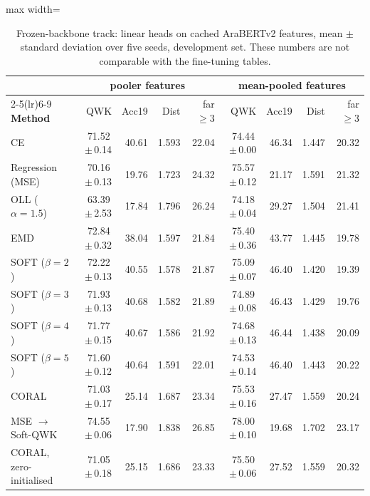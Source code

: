\begin{table}[H]
\centering
\footnotesize
\caption{Frozen-backbone track: linear heads on cached AraBERTv2 features, mean $\pm$ standard deviation over five seeds, development set. These numbers are not comparable with the fine-tuning tables.}
\label{tab:res-cpu}
\begin{adjustbox}{max width=\textwidth}
\begin{tabular}{lrrrrrrrr}
\toprule
& \multicolumn{4}{c}{\textbf{pooler features}} & \multicolumn{4}{c}{\textbf{mean-pooled features}} \\
\cmidrule(lr){2-5}\cmidrule(lr){6-9}
\textbf{Method} & QWK & Acc19 & Dist & far$\geq$3 & QWK & Acc19 & Dist & far$\geq$3 \\
\midrule
CE & 71.52\,$\pm$\,0.14 & 40.61 & 1.593 & 22.04 & 74.44\,$\pm$\,0.00 & 46.34 & 1.447 & 20.32 \\
Regression (MSE) & 70.16\,$\pm$\,0.13 & 19.76 & 1.723 & 24.32 & 75.57\,$\pm$\,0.12 & 21.17 & 1.591 & 21.32 \\
OLL ($\alpha=1.5$) & 63.39\,$\pm$\,2.53 & 17.84 & 1.796 & 26.24 & 74.18\,$\pm$\,0.04 & 29.27 & 1.504 & 21.41 \\
EMD & 72.84\,$\pm$\,0.32 & 38.04 & 1.597 & 21.84 & 75.40\,$\pm$\,0.36 & 43.77 & 1.445 & 19.78 \\
SOFT ($\beta=2$) & 72.22\,$\pm$\,0.13 & 40.55 & 1.578 & 21.87 & 75.09\,$\pm$\,0.07 & 46.40 & 1.420 & 19.39 \\
SOFT ($\beta=3$) & 71.93\,$\pm$\,0.13 & 40.68 & 1.582 & 21.89 & 74.89\,$\pm$\,0.08 & 46.43 & 1.429 & 19.76 \\
SOFT ($\beta=4$) & 71.77\,$\pm$\,0.15 & 40.67 & 1.586 & 21.92 & 74.68\,$\pm$\,0.13 & 46.44 & 1.438 & 20.09 \\
SOFT ($\beta=5$) & 71.60\,$\pm$\,0.12 & 40.64 & 1.591 & 22.01 & 74.53\,$\pm$\,0.14 & 46.40 & 1.443 & 20.22 \\
CORAL & 71.03\,$\pm$\,0.17 & 25.14 & 1.687 & 23.34 & 75.53\,$\pm$\,0.16 & 27.47 & 1.559 & 20.24 \\
\midrule
MSE $\rightarrow$ Soft-QWK & 74.55\,$\pm$\,0.06 & 17.90 & 1.838 & 26.85 & 78.00\,$\pm$\,0.10 & 19.68 & 1.702 & 23.17 \\
\midrule
CORAL, zero-initialised & 71.05\,$\pm$\,0.18 & 25.15 & 1.686 & 23.33 & 75.50\,$\pm$\,0.06 & 27.52 & 1.559 & 20.32 \\
\bottomrule
\end{tabular}
\end{adjustbox}
\end{table}
